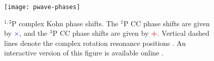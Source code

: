\documentclass[Dissertation.tex]{subfiles}
\begin{document}
%

\begin{figure}
	\centering
	\texttt{[image: pwave-phases]}
	\caption[$^{1,3}$P phase shifts]{$^{1,3}$P complex Kohn phase shifts. The $^1$P CC phase shifts
\cite{Walters2004} are given by \mbox{\textcolor{blue}{$\times$}}, and the
$^3$P CC phase shifts \cite{Blackwood2002} are given by
\mbox{\textcolor{red}{\textbf{+}}}. Vertical dashed lines denote the complex rotation resonance
positions \cite{Yan1999}. An interactive version of this figure is available online \cite{Plotly}.}
	\label{fig:PWavePhase}
\end{figure}
\end{document}
